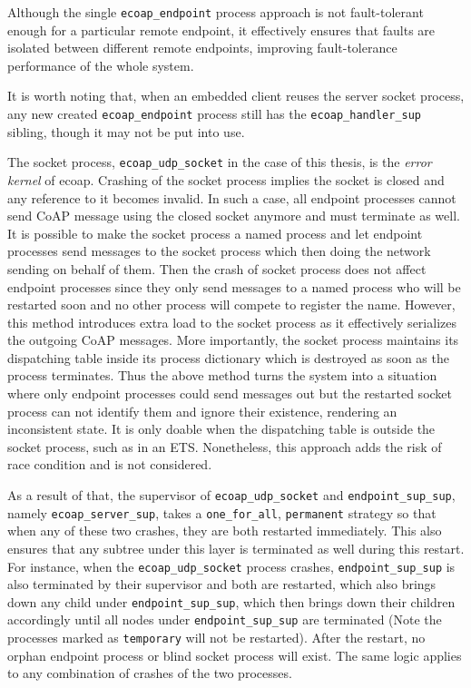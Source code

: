 Although the single \verb|ecoap_endpoint| process approach is not fault-tolerant enough for a particular remote endpoint, it effectively ensures that faults are isolated between different remote endpoints, improving fault-tolerance performance of the whole system. 

It is worth noting that, when an embedded client reuses the server socket process, any new created \verb|ecoap_endpoint| process still has the \verb|ecoap_handler_sup| sibling, though it may not be put into use. 

The socket process, \verb|ecoap_udp_socket| in the case of this thesis, is the \textit{error kernel} of ecoap. Crashing of the socket process implies the socket is closed and any reference to it becomes invalid. In such a case, all endpoint processes cannot send CoAP message using the closed socket anymore and must terminate as well. It is possible to make the socket process a named process and let endpoint processes send messages to the socket process which then doing the network sending on behalf of them. Then the crash of socket process does not affect endpoint processes since they only send messages to a named process who will be restarted soon and no other process will compete to register the name. However, this method introduces extra load to the socket process as it effectively serializes the outgoing CoAP messages. More importantly, the socket process maintains its dispatching table inside its process dictionary which is destroyed as soon as the process terminates. Thus the above method turns the system into a situation where only endpoint processes could send messages out but the restarted socket process can not identify them and ignore their existence, rendering an inconsistent state. It is only doable when the dispatching table is outside the socket process, such as in an ETS. Nonetheless, this approach adds the risk of race condition and is not considered. 

As a result of that, the supervisor of \verb|ecoap_udp_socket| and \verb|endpoint_sup_sup|, namely \verb|ecoap_server_sup|, takes a \verb|one_for_all|, \verb|permanent| strategy so that when any of these two crashes, they are both restarted immediately. This also ensures that any subtree under this layer is terminated as well during this restart. For instance, when the \verb|ecoap_udp_socket| process crashes, \verb|endpoint_sup_sup| is also terminated by their supervisor and both are restarted, which also brings down any child under \verb|endpoint_sup_sup|, which then brings down their children accordingly until all nodes under \verb|endpoint_sup_sup| are terminated (Note the processes marked as \verb|temporary| will not be restarted). After the restart, no orphan endpoint process or blind socket process will exist. The same logic applies to any combination of crashes of the two processes. 

